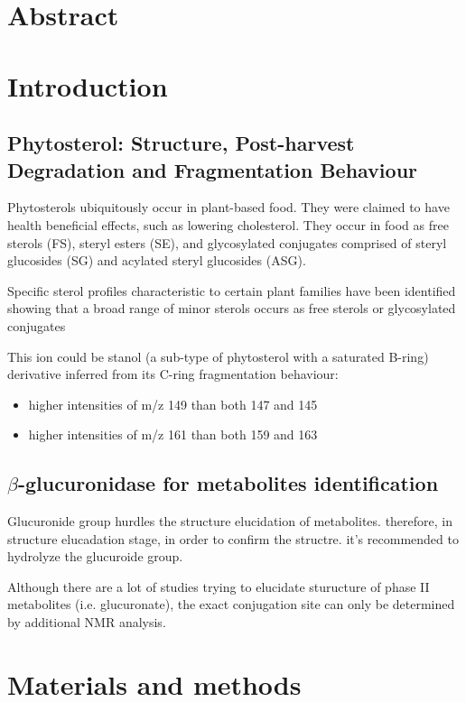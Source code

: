 \section{Abstract}

\section{Introduction}
\subsection{Phytosterol: Structure, Post-harvest Degradation and Fragmentation Behaviour}
Phytosterols ubiquitously occur in plant-based food\cite{sterolmsms}. They were claimed to have health beneficial effects, such as lowering cholesterol. They occur in food as free sterols (FS), steryl esters (SE), and glycosylated conjugates comprised of steryl glucosides (SG) and acylated steryl glucosides (ASG).

Specific sterol profiles characteristic to certain plant families have been identified showing that a broad range of minor sterols occurs as free sterols or glycosylated conjugates

This ion could be stanol (a sub-type of phytosterol with a saturated B-ring) derivative inferred from its C-ring fragmentation behaviour: 
\begin{itemize}
	\item higher intensities of m/z 149 than both 147 and 145
	\item higher intensities of m/z 161 than both 159 and 163
\end{itemize}
 

\subsection{$\beta$-glucuronidase for metabolites identification}

Glucuronide group hurdles the structure elucidation of metabolites.
therefore, in structure elucadation stage, in order to confirm the structre. it's recommended to hydrolyze the glucuroide group.

Although there are a lot of studies trying to elucidate sturucture of phase II metabolites (i.e. glucuronate), the exact conjugation site can only be determined by additional NMR analysis. 

\section{Materials and methods}

